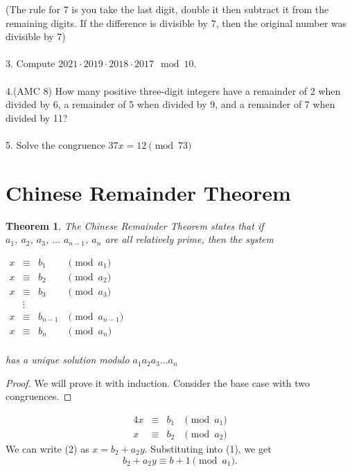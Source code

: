 \documentclass[letterpaper]{article}
\theoremstyle{plain}
\newtheorem{thm}{Theorem}[section]
\theoremstyle{definition}
\theoremstyle{remark}
\begin{document}
(The rule for 7 is you take the last digit, double it then subtract it from the remaining digits. If the difference is divisible by 7, then the original number was divisible by 7)
\\
\\
3. Compute $2021 \cdot 2019 \cdot 2018 \cdot 2017 \mod{10}$.\\\\
4.(AMC 8) How many positive three-digit integers have a remainder of 2 when divided by 6, a remainder of 5 when divided by 9, and a remainder of 7 when divided by 11?\\\\
5. Solve the congruence $37x = 12 \pmod{73}$
\section{Chinese Remainder Theorem}
\begin{mdframed}
    \begin{thm} 
        The Chinese Remainder Theorem states that if \\$a_1$, $a_2$, $a_3$, $\dots$ $a_{n-1}$, $a_n$ are all relatively prime, then the system
    \begin{center}
        $\begin{array}{rcll}
             x &\equiv &b_1 &\pmod{a_1}\\
             x &\equiv &b_2 &\pmod{a_2}\\
             x &\equiv &b_3 &\pmod{a_3}\\
               &\vdots & &\\
            x &\equiv &b_{n-1} &\pmod{a_{n-1}}\\

             x &\equiv &b_n &\pmod{a_n}\\
        \end{array}$
    \end{center}
    has a unique solution modulo $a_1 a_2 a_3 \dots a_n$
\end{thm}

\end{mdframed}
\begin{proof} We will prove it with induction. Consider the base case with two congruences. 
\end{proof}
\begin{alignat}{4}
    x &\equiv &b_1 &\pmod{a_1}\\
    x &\equiv &b_{2} &\pmod{a_{2}}
\end{alignat}
We can write (2) as $x = b_2 + a_2y$. Substituting into (1), we get $$b_2 + a_2y \equiv b+1 \pmod{a_1}.$$
\end{document}

